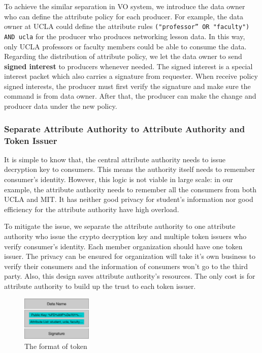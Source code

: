 To achieve the similar separation in VO system, we introduce the data owner who can define the attribute policy for each producer.
For example, the data owner at UCLA could define the attribute rules \texttt{("professor'' OR "faculty") AND ucla} for the producer who produces networking lesson data.
In this way, only UCLA professors or faculty members could be able to consume the data.
Regarding the distribution of attribute policy, we let the data owner to send \textbf{signed interest} to producers whenever needed.
The signed interest is a special interest packet which also carries a signature from requester.
When receive policy signed interests, the producer must first verify the signature and make sure the command is from data owner.
After that, the producer can make the change and producer data under the new policy.

\subsubsection{Separate Attribute Authority to Attribute Authority and Token Issuer}
It is simple to know that, the central attribute authority needs to issue decryption key to consumers.
This means the authority itself needs to remember consumer's identity.
However, this logic is not viable in large scale: in our example, the attribute authority needs to remember all the consumers from both UCLA and MIT.
It has neither good privacy for student's information nor good efficiency for the attribute authority have high overload.

To mitigate the issue, we separate the attribute authority to one attribute authority who issue the crypto decryption key and multiple token issuers who verify consumer's identity.
Each member organization should have one token issuer.
The privacy can be ensured for organization will take it's own business to verify their consumers and the information of consumers won't go to the third party.
Also, this design saves attribute authority's resources.
The only cost is for attribute authority to build up the trust to each token issuer.

\begin{figure}[H]
  \centering
  \includegraphics[width=0.3\textwidth]{figures/token}
  \vspace{-3mm}
  \caption{The format of token}
  \label{fig:token}
\end{figure}

